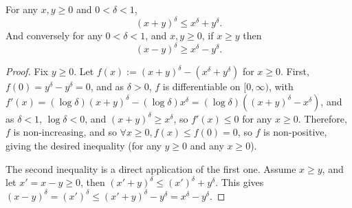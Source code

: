 \documentclass[12pt]{colt2018} %
\begin{document}

\begin{lemma}\label{lem:expoInequality}
    For any $x,y \geq 0$ and $0 < \delta < 1$,
    \begin{equation}\label{eq:expoInequality1}
        (x + y)^{\delta} \leq x^{\delta} + y^{\delta}.
    \end{equation}
    And conversely for any $0 < \delta < 1$, and $x,y \geq 0$, if $x \geq y$ then
    \begin{equation}\label{eq:expoInequality3}
        (x - y)^{\delta} \geq x^{\delta} - y^{\delta}.
    \end{equation}
\end{lemma}
\begin{proof}\label{proof:expoInequality}
    Fix $y\geq0$. Let $f(x):=(x+y)^{\delta} - (x^{\delta} + y^{\delta})$ for $x\geq0$.
    First, $f(0)= y^{\delta} - y^{\delta} = 0$,
    and as $\delta>0$, $f$ is differentiable on $[0, \infty)$, with
    $f'(x) = (\log \delta)(x+y)^{\delta} - (\log \delta)x^{\delta} = (\log \delta)( (x+y)^{\delta} - x^{\delta})$,
    and as $\delta < 1$, $\log\delta < 0$, and $(x+y)^{\delta} \geq x^{\delta}$, so $f'(x) \leq 0$ for any $x\geq0$.
    Therefore, $f$ is non-increasing, and so $\forall x\geq0, f(x) \leq f(0) = 0$, so $f$ is non-positive, giving the desired inequality (for any $y\geq0$ and any $x\geq0$).


    The second inequality is a direct application of the first one.
    Assume $x \geq y$, and let $x' = x - y \geq 0$, then
    $(x' + y)^{\delta} \leq (x')^{\delta} + y^{\delta}$.
    This gives $(x-y)^{\delta} = (x')^{\delta} \leq (x'+y)^{\delta} - y^{\delta} = x^{\delta} - y^{\delta}$.
\end{proof}
\end{document}

